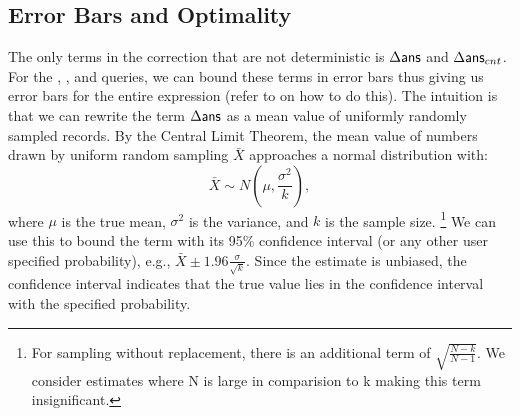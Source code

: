 \subsection{Error Bars and Optimality}\label{subsec:correct-practical}
The only terms in the correction that are not deterministic is $\Delta\textsf{ans}$ and $\Delta\textsf{ans}_{cnt}$.
For the \sumfunc, \countfunc, and \avgfunc queries, we can bound these terms in error bars thus giving us error bars for the entire expression (refer to \cite{wang1999sample} on how to do this).
The intuition is that we can rewrite the term $\Delta\textsf{ans}$ as a mean value of uniformly randomly sampled records.
By the Central Limit Theorem, the mean value of numbers drawn by uniform random sampling $\bar{X}$ approaches a normal distribution with:
\[
\bar{X} \sim N(\mu,\frac{\sigma^2}{k}),
\]
where $\mu$ is the true mean, $\sigma^2$ is the variance, and $k$ is the sample size. \footnote{For sampling without replacement, there is an additional term of $\sqrt{\frac{N-k}{N-1}}$. We consider estimates where N is large in comparision to k making this term insignificant.}
We can use this to bound the term with its 95\% confidence interval (or any other user specified probability), e.g., $\bar{X} \pm 1.96 \frac{\sigma}{\sqrt{k}}$.
Since the estimate is unbiased, the confidence interval indicates that the true value lies in the confidence interval with the specified probability.

